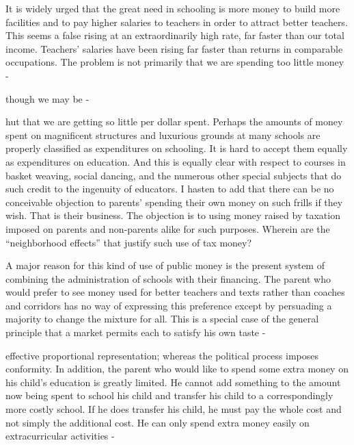 \documentclass[11pt,openany]{book}
\begin{document}
It is widely urged that the great need in schooling is more money to build more facilities and to pay higher salaries to teachers in order to attract better teachers. This seems a false rising at an extraordinarily high rate, far faster than our total income. Teachers' salaries have been rising far faster than returns in comparable occupations. The problem is not primarily that we are spending too little money -

though we may be -

hut that we are getting so little per dollar spent. Perhaps the amounts of money spent on magnificent structures and luxurious grounds at many schools are properly classified as expenditures on schooling. It is hard to accept them equally as expenditures on education. And this is equally clear with respect to courses in basket weaving, social dancing, and the numerous other special subjects that do such credit to the ingenuity of educators. I hasten to add that there can be no conceivable objection to parents' spending their own money on such frills if they wish. That is their business. The objection is to using money raised by taxation imposed on parents and non-parents alike for such purposes. Wherein are the ``neighborhood effects'' that justify such use of tax money?

A major reason for this kind of use of public money is the present system of combining the administration of schools with their financing. The parent who would prefer to see money used for better teachers and texts rather than coaches and corridors has no way of expressing this preference except by persuading a majority to change the mixture for all. This is a special case of the general principle that a market permits each to satisfy his own taste -

effective proportional representation; whereas the political process imposes conformity. In addition, the parent who would like to spend some extra money on his child's education is greatly limited. He cannot add something to the amount now being spent to school his child and transfer his child to a correspondingly more costly school. If he does transfer his child, he must pay the whole cost and not simply the additional cost. He can only spend extra money easily on extracurricular activities -
\end{document}
